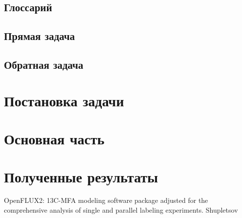 \documentclass[a4paper, 12pt, left=30mm, right=15mm, top=20mm, bottom=20mm]{report}
\begin{document}
\section{Глоссарий}
\section{Прямая задача}
\section{Обратная задача}
\chapter{Постановка задачи}
\chapter{Основная часть}
\chapter{Полученные результаты}

\begin{thebibliography}{XXXX}
	OpenFLUX2: 13C-MFA modeling software package adjusted for the comprehensive analysis of single and parallel labeling experiments. Shupletsov
\end{thebibliography}
\end{document}
